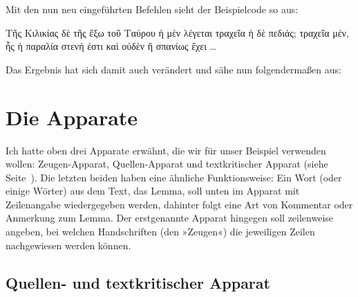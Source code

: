 \begin{lfgwcode}{}
\setcounter{alteSeite}{269}
\newcommand\alteSeite{{|\ledsidenote{\emph{T}~\thealteSeite\stepcounter{alteSeite}}}}
\end{lfgwcode}

Mit den nun neu eingeführten Befehlen sieht der Beispielcode so aus:

\begin{lfgwcode}{}
\beginnumbering
{}
Τῆς Κιλικίας δὲ τῆς ἔξω τοῦ Ταύρου ἡ μὲν λέγεται τραχεῖα ἡ δὲ πεδιάς;
τραχεῖα μέν, ἧς ἡ παραλία \alteSeite{} στενή ἐστι καὶ οὐδὲν ἢ σπανίως ἔχει \dots{}
\pend
\endnumbering
\end{lfgwcode}

Das Ergebnis hat sich damit auch verändert und sähe nun folgendermaßen aus:

\begin{reledmacbsp}{\bsplineenum}
\end{reledmacbsp}


\section{Die Apparate}

Ich hatte oben drei Apparate erwähnt, die wir für unser Beispiel verwenden wollen: 
Zeugen-Apparat, Quellen-Apparat und textkritischer Apparat (siehe Seite~\pageref{pil:apparat}). 
Die letzten beiden haben eine ähnliche Funktionsweise: 
Ein Wort (oder einige Wörter) aus dem Text, das Lemma, soll unten im Apparat mit Zeilenangabe wiedergegeben werden, dahinter folgt eine Art von Kommentar oder Anmerkung 
zum Lemma. Der erstgenannte Apparat hingegen soll zeilenweise angeben, 
bei welchen Handschriften (den »Zeugen«) die jeweiligen Zeilen nachgewiesen werden können.


\subsection{Quellen- und textkritischer Apparat}

